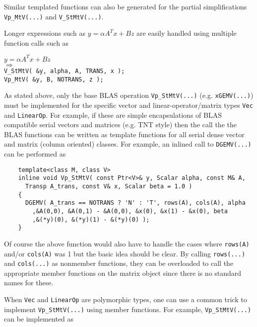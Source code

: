 \documentclass[acmtoms,acmnow]{acmtrans2m}
\begin{document}
Similar templated functions can also be generated for the partial
simplifications {}\texttt{Vp\_MtV(...)} and {}\texttt{V\_StMtV(...)}.

Longer expressions such as $y = \alpha A^T x + B z$ are easily handled using multiple
function calls such as\\[1ex]

{\bsinglespace
\hspace*{4ex}\parbox{\textwidth}{
$y = \alpha A^T x + B z$ \\
$\Longrightarrow$\\
\texttt{V\_StMtV( \&y, alpha, A, TRANS, x );}\\
\texttt{Vp\_MtV( \&y, B, NOTRANS, z );}
}
\esinglespace}

As stated above, only the base BLAS operation
{}\texttt{Vp\_StMtV(...)} (e.g. {}\texttt{xGEMV(...)}) must be
implemented for the specific vector and linear-operator/matrix types
{}\texttt{Vec} and {}\texttt{LinearOp}.  For example, if these are
simple encapsulations of BLAS compatible serial vectors and matrices
(e.g. TNT style) then the call the the BLAS functions can be written
as template functions for all serial dense vector and matrix (column
oriented) classes.  For example, an inlined call to
{}\texttt{DGEMV(...)} can be performed as\\[1ex]

{\bsinglespace\small
\begin{minipage}{\textwidth}
\begin{verbatim}
    template<class M, class V>
    inline void Vp_StMtV( const Ptr<V>& y, Scalar alpha, const M& A,
      Transp A_trans, const V& x, Scalar beta = 1.0 )
    {
      DGEMV( A_trans == NOTRANS ? 'N' : 'T', rows(A), cols(A), alpha
        ,&A(0,0), &A(0,1) - &A(0,0), &x(0), &x(1) - &x(0), beta
        ,&(*y)(0), &(*y)(1) - &(*y)(0) );
    }
\end{verbatim}
\end{minipage}
\esinglespace}

Of course the above function would also have to handle the cases where
{}\texttt{rows(A)} and/or {}\texttt{cols(A)} was 1 but the basic idea should
be clear.  By calling {}\texttt{rows(...)} and {}\texttt{cols(...)} as
nonmember functions, they can be overloaded to call the appropriate member
functions on the matrix object since there is no standard names for these.

When {}\texttt{Vec} and {}\texttt{LinearOp} are polymorphic types, one
can use a common trick to implement {}\texttt{Vp\_StMtV(...)} using
member functions.  For example, {}\texttt{Vp\_StMtV(...)} can be
implemented as\\[1ex]
\end{document}
